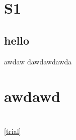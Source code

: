 \documentclass{article}
\begin{document}
\section{S1}
  \subsection{hello}  awdaw dawdawdawda \section{awdawd}
  \section{}




\begin{figure}[h t p b] %
  \centering
  \caption{}
  \label{}
\end{figure}
\section{}

\ref{trial}

\cites[][]{world}
\end{document}
